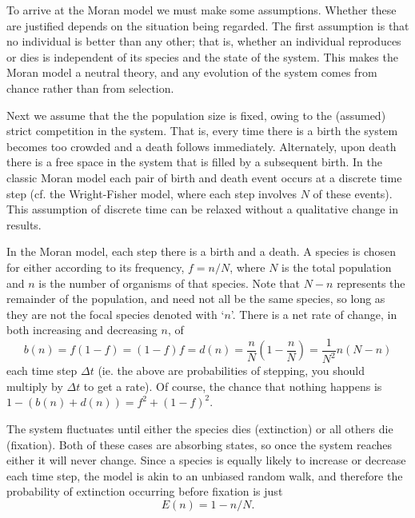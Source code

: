 \documentclass[a4paper,11pt]{article}
\numberwithin{equation}{section} %
\begin{document}
To arrive at the Moran model we must make some assumptions. 
Whether these are justified depends on the situation being regarded. 
The first assumption is that no individual is better than any other; that is, whether an individual reproduces or dies is independent of its species and the state of the system. 
This makes the Moran model a neutral theory, and any evolution of the system comes from chance rather than from selection. 

Next we assume that the the population size is fixed, owing to the (assumed) strict competition in the system. 
That is, every time there is a birth the system becomes too crowded and a death follows immediately. Alternately, upon death there is a free space in the system that is filled by a subsequent birth. 
In the classic Moran model each pair of birth and death event occurs at a discrete time step (cf. the Wright-Fisher model, where each step involves $N$ of these events). 
This assumption of discrete time can be relaxed without a qualitative change in results. 

In the Moran model, each step there is a birth and a death. 
A species is chosen for either according to its frequency, $f=n/N$, where $N$ is the total population and $n$ is the number of organisms of that species. Note that $N-n$ represents the remainder of the population, and need not all be the same species, so long as they are not the focal species denoted with `$n$'. 
There is a net rate of change, in both increasing and decreasing $n$, of
\begin{equation}
b(n) = f(1-f) = (1-f)f = d(n) = \frac{n}{N}\left(1-\frac{n}{N}\right) = \frac{1}{N^2}n(N-n)
\end{equation}
each time step $\Delta t$ (ie. the above are probabilities of stepping, you should multiply by $\Delta t$ to get a rate). 
Of course, the chance that nothing happens is $1-\left(b(n)+d(n)\right) = f^2 + (1-f)^2$. 

The system fluctuates until either the species dies (extinction) or all others die (fixation). 
Both of these cases are absorbing states, so once the system reaches either it will never change. 
Since a species is equally likely to increase or decrease each time step, the model is akin to an unbiased random walk, and therefore the probability of extinction occurring before fixation is just
\begin{equation}
E(n) = 1-n/N. 
\end{equation}
\end{document}
